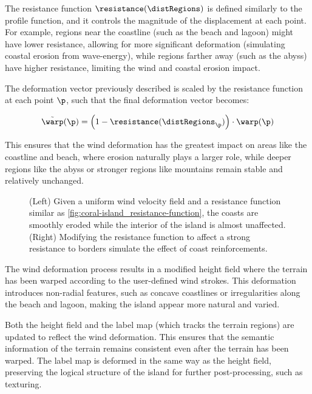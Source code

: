 The resistance function $\resistance(\distRegions)$ is defined similarly to the profile function, and it controls the magnitude of the displacement at each point. For example, regions near the coastline (such as the beach and lagoon) might have lower resistance, allowing for more significant deformation (simulating coastal erosion from wave-energy), while regions farther away (such as the abyss) have higher resistance, limiting the wind and coastal erosion impact.

The deformation vector previously described is scaled by the resistance function at each point $\p$, such that the final deformation vector becomes:

\begin{align}
    \Tilde{\warp}(\p) = \left(1 - \resistance(\distRegions_\p) \right) \cdot \warp(\p)
\end{align}

This ensures that the wind deformation has the greatest impact on areas like the coastline and beach, where erosion naturally plays a larger role, while deeper regions like the abyss or stronger regions like mountains remain stable and relatively unchanged.

\begin{figure}[H]
    \caption{(Left) Given a uniform wind velocity field and a resistance function similar as \cref{fig:coral-island_resistance-function}, the coasts are smoothly eroded while the interior of the island is almost unaffected. (Right) Modifying the resistance function to affect a strong resistance to borders simulate the effect of coast reinforcements.}
\end{figure}


The wind deformation process results in a modified height field where the terrain has been warped according to the user-defined wind strokes. This deformation introduces non-radial features, such as concave coastlines or irregularities along the beach and lagoon, making the island appear more natural and varied.

Both the height field and the label map (which tracks the terrain regions) are updated to reflect the wind deformation. This ensures that the semantic information of the terrain remains consistent even after the terrain has been warped. The label map is deformed in the same way as the height field, preserving the logical structure of the island for further post-processing, such as texturing.

